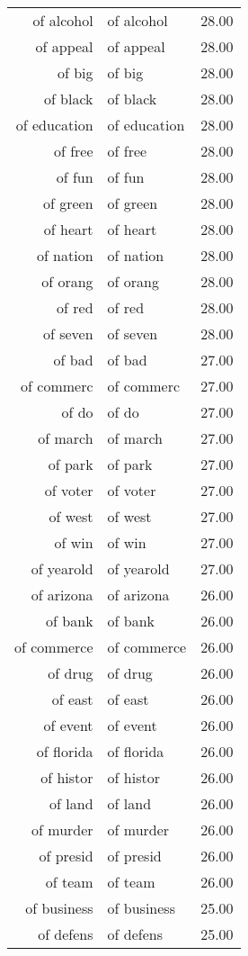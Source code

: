 \begin{table}[ht]
\begin{tabular}{rlr}
  of alcohol & of alcohol & 28.00 \\ 
  of appeal & of appeal & 28.00 \\ 
  of big & of big & 28.00 \\ 
  of black & of black & 28.00 \\ 
  of education & of education & 28.00 \\ 
  of free & of free & 28.00 \\ 
  of fun & of fun & 28.00 \\ 
  of green & of green & 28.00 \\ 
  of heart & of heart & 28.00 \\ 
  of nation & of nation & 28.00 \\ 
  of orang & of orang & 28.00 \\ 
  of red & of red & 28.00 \\ 
  of seven & of seven & 28.00 \\ 
  of bad & of bad & 27.00 \\ 
  of commerc & of commerc & 27.00 \\ 
  of do & of do & 27.00 \\ 
  of march & of march & 27.00 \\ 
  of park & of park & 27.00 \\ 
  of voter & of voter & 27.00 \\ 
  of west & of west & 27.00 \\ 
  of win & of win & 27.00 \\ 
  of yearold & of yearold & 27.00 \\ 
  of arizona & of arizona & 26.00 \\ 
  of bank & of bank & 26.00 \\ 
  of commerce & of commerce & 26.00 \\ 
  of drug & of drug & 26.00 \\ 
  of east & of east & 26.00 \\ 
  of event & of event & 26.00 \\ 
  of florida & of florida & 26.00 \\ 
  of histor & of histor & 26.00 \\ 
  of land & of land & 26.00 \\ 
  of murder & of murder & 26.00 \\ 
  of presid & of presid & 26.00 \\ 
  of team & of team & 26.00 \\ 
  of business & of business & 25.00 \\ 
  of defens & of defens & 25.00 \\ 

\end{tabular}
\end{table}
